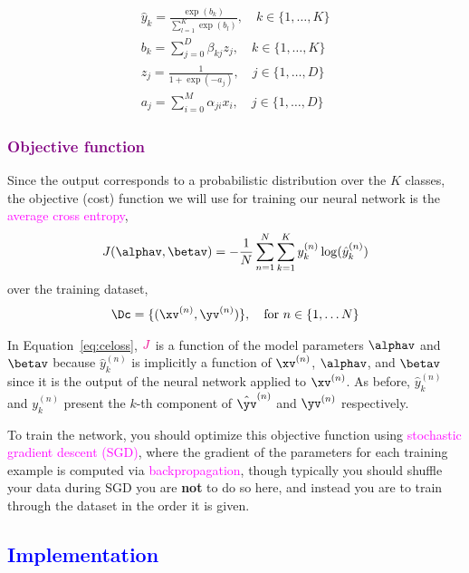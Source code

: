 \begin{gather*}
\hat{y}_k = \frac{\exp(b_k)}{\sum_{l=1}^K \exp(b_l)},\quad k\in\{1,\dots,K\}
\\[3mm]
b_k =  \sum_{j=0}^D \beta_{kj} z_j,\quad k\in\{1,\dots,K\}
\\[3mm]
z_j = \frac{1}{1+\exp(-a_j)},\quad j\in\{1,\dots,D\}
\\[3mm]
a_j = \sum_{i=0}^M \alpha_{ji} x_i,\quad j\in\{1,\dots,D\}
\end{gather*}


\newpage

\subsubsection*{\textcolor{purple}{Objective function}}
Since the output corresponds to a probabilistic distribution over the $K$ classes, the objective (cost) function we will use for training our neural network is the \textcolor{magenta}{average cross entropy},
\begin{gather}
\label{eq:celoss}
J(\alphav, \betav)= - \frac{1}{N} \sum_{n=1}^N \sum_{k=1}^{K} y_k^{(n)} \log (\hat{y}^{(n)}_k)
\end{gather}
over the training dataset,
\begin{gather*}
\Dc = \{ (\xv^{(n)}, \yv^{(n)})\}, \quad\text{for $n\in\{1,\ldots N\}$} 
\end{gather*}


In Equation~\eqref{eq:celoss}, $\textcolor{magenta}{J}$ is a function of the model parameters $\alphav$ and $\betav$ because $\hat{y}^{(n)}_k$ is implicitly a function of $\xv^{(n)}$, $\alphav$, and $\betav$ since it is the output of the neural network applied to $\xv^{(n)}$. As before, $\hat{y}^{(n)}_k$ and $y_k^{(n)}$ present the $k$-th component of $\hat{\yv}^{(n)}$ and $\yv^{(n)}$ respectively.


To train the network, you should optimize this objective function using \textcolor{magenta}{stochastic gradient descent (SGD)}, where the gradient of the parameters for each training example is computed via \textcolor{magenta}{backpropagation}, though typically you should shuffle your data during SGD you are \textbf{not} to do so here, and instead you are to train through the dataset in the order it is given.

\subsection*{\textcolor{blue}{Implementation}}
\label{sec:model}

